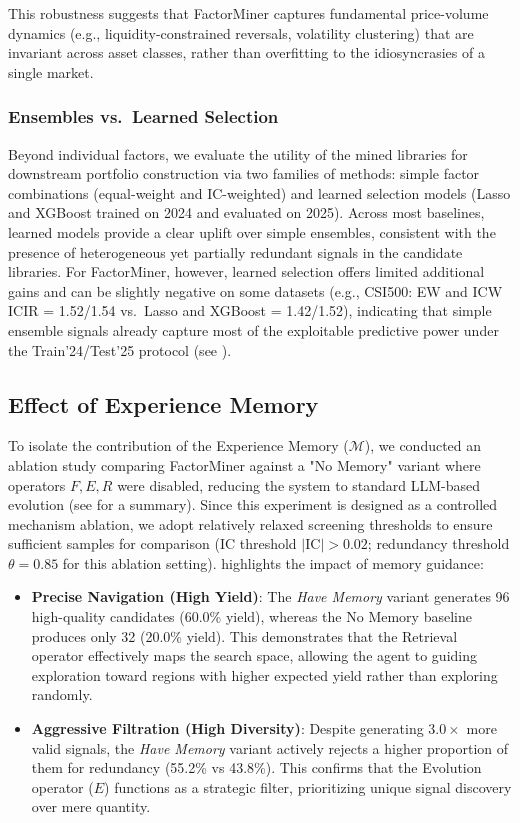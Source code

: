 \documentclass[sigconf]{acmart}
\begin{document}
This robustness suggests that FactorMiner captures fundamental price-volume dynamics (e.g., liquidity-constrained reversals, volatility clustering) that are invariant across asset classes, rather than overfitting to the idiosyncrasies of a single market.

\subsubsection{Ensembles vs.\ Learned Selection}
\label{sec:results-ensemble}
Beyond individual factors, we evaluate the utility of the mined libraries for downstream portfolio construction via two families of methods: simple factor combinations (equal-weight and IC-weighted) and learned selection models (Lasso and XGBoost trained on 2024 and evaluated on 2025). Across most baselines, learned models provide a clear uplift over simple ensembles, consistent with the presence of heterogeneous yet partially redundant signals in the candidate libraries. For FactorMiner, however, learned selection offers limited additional gains and can be slightly negative on some datasets (e.g., CSI500: EW and ICW ICIR = 1.52/1.54 vs.\ Lasso and XGBoost = 1.42/1.52), indicating that simple ensemble signals already capture most of the exploitable predictive power under the Train'24/Test'25 protocol (see ).

\subsection{Effect of Experience Memory}
\label{sec:ablation}
To isolate the contribution of the Experience Memory ($\mathcal{M}$), we conducted an ablation study comparing FactorMiner against a "No Memory" variant where operators $F, E, R$ were disabled, reducing the system to standard LLM-based evolution (see  for a summary).
Since this experiment is designed as a controlled mechanism ablation, we adopt relatively relaxed screening thresholds to ensure sufficient samples for comparison (IC threshold $|\text{IC}|>0.02$; redundancy threshold $\theta=0.85$ for this ablation setting). highlights the impact of memory guidance:
{\setlength{\leftmargini}{1.2em}%
\begin{itemize}
    \item \textbf{Precise Navigation (High Yield)}: The \textit{Have Memory} variant generates 96 high-quality candidates (60.0\% yield), whereas the No Memory baseline produces only 32 (20.0\% yield). This demonstrates that the Retrieval operator effectively maps the search space, allowing the agent to guiding exploration toward regions with higher expected yield rather than exploring randomly.
    \item \textbf{Aggressive Filtration (High Diversity)}: Despite generating $3.0\times$ more valid signals, the \textit{Have Memory} variant actively rejects a higher proportion of them for redundancy (55.2\% vs 43.8\%). This confirms that the Evolution operator ($E$) functions as a strategic filter, prioritizing unique signal discovery over mere quantity.
\end{itemize}
}
\end{document}
